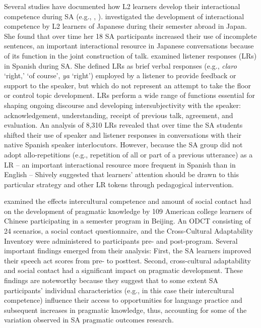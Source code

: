 \documentclass[output=paper]{langscibook}
\begin{document}
  Several studies have documented how L2 learners develop their interactional competence during SA (e.g., \citealt{Dings2014,Ishida2010,Masuda2011,Shively2015}, \citealt{Shively2016,Taguchi2014development}). \citet{Taguchi2014development} investigated the development of interactional competence by L2 learners of Japanese during their semester abroad in Japan. She found that over time her 18 SA participants increased their use of incomplete sentences, an important interactional resource in Japanese conversations because of its function in the joint construction of talk. \citet{Shively2015} examined listener responses (LRs) in Spanish during SA. She defined LRs as brief verbal responses (e.g., \textit{claro} ‘right,’ ‘of course’, \textit{ya} ‘right’) employed by a listener to provide feedback or support to the speaker, but which do not represent an attempt to take the floor or control topic development. LRs perform a wide range of functions essential for shaping ongoing discourse and developing intersubjectivity with the speaker: acknowledgement, understanding, receipt of previous talk, agreement, and evaluation. An analysis of 8,310 LRs revealed that over time the SA students shifted their use of speaker and listener responses in conversations with their native Spanish speaker interlocutors. However, because the SA group did not adopt allo-repetitions (e.g., repetition of all or part of a previous utterance) as a LR -- an important interactional resource more frequent in Spanish than in English -- Shively suggested that learners’ attention should be drawn to this particular strategy and other LR tokens through pedagogical intervention.

\begin{sloppypar}
  \citet{TaguchiLi2016} examined the effects intercultural competence and amount of social contact had on the development of pragmatic knowledge by 109 American college learners of Chinese participating in a semester program in Beijing. An ODCT consisting of 24 scenarios, a social contact questionnaire, and the Cross-Cultural Adaptability Inventory \citep{KelleyMeyers1995} were administered to participants pre- and post-program. Several important findings emerged from their analysis: First, the SA learners improved their speech act scores from pre- to posttest. Second, cross-cultural adaptability and social contact had a significant impact on pragmatic development. These findings are noteworthy because they suggest that to some extent SA participants’ individual characteristics (e.g., in this case their intercultural competence) influence their access to opportunities for language practice and subsequent increases in pragmatic knowledge, thus, accounting for some of the variation observed in SA pragmatic outcomes research.
\end{sloppypar}
\end{document}
